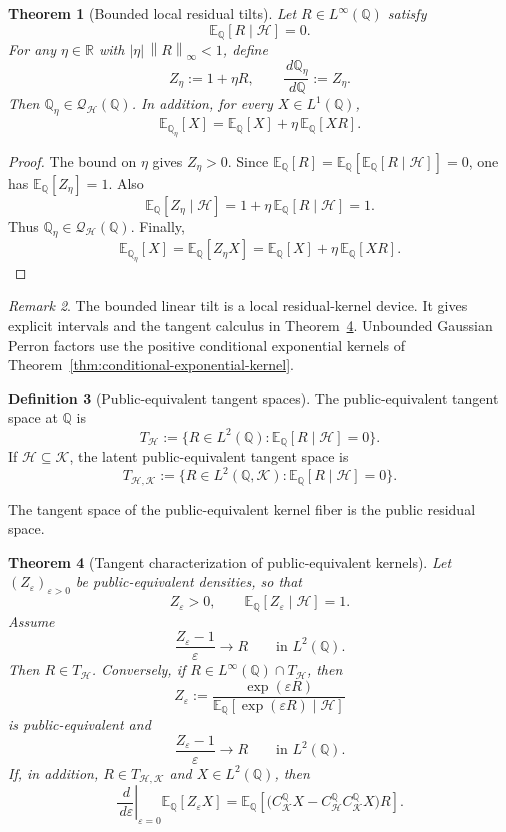 \documentclass[11pt,a4paper]{amsart}
\theoremstyle{plain}
\newtheorem{theorem}{Theorem}[section]
\theoremstyle{definition}
\newtheorem{definition}[theorem]{Definition}
\theoremstyle{remark}
\newtheorem{remark}[theorem]{Remark}
\newcommand{\R}{\mathbb{R}}
\newcommand{\QQ}{\mathbb{Q}}
\newcommand{\EE}{\mathbb{E}}
\newcommand{\cH}{\mathcal{H}}
\newcommand{\cK}{\mathcal{K}}
\newcommand{\cQ}{\mathcal{Q}}
\newcommand{\dd}{\,d}
\newcommand{\eps}{\varepsilon}
\newcommand{\norm}[1]{\left\lVert #1\right\rVert}
\begin{document}
\begin{theorem}[Bounded local residual tilts]\label{thm:kernel-tilt}
Let \(R\in L^\infty(\QQ)\) satisfy
\[
        \EE_\QQ[R\mid\cH]=0.
\]
For any \(\eta\in\R\) with \(|\eta|\,\norm{R}_\infty<1\), define
\[
        Z_\eta:=1+\eta R,
        \qquad
        \frac{\dd\QQ_\eta}{\dd\QQ}:=Z_\eta.
\]
Then \(\QQ_\eta\in\cQ_{\cH}(\QQ)\).  In addition, for every \(X\in L^1(\QQ)\),
\[
        \EE_{\QQ_\eta}[X]
        =
        \EE_\QQ[X]+\eta\,\EE_\QQ[XR].
\]
\end{theorem}

\begin{proof}
The bound on \(\eta\) gives \(Z_\eta>0\).  Since
\(\EE_\QQ[R]=\EE_\QQ[\EE_\QQ[R\mid\cH]]=0\), one has \(\EE_\QQ[Z_\eta]=1\).  Also
\[
        \EE_\QQ[Z_\eta\mid\cH]
        =
        1+\eta\,\EE_\QQ[R\mid\cH]
        =
        1.
\]
Thus \(\QQ_\eta\in\cQ_{\cH}(\QQ)\).  Finally,
\[
        \EE_{\QQ_\eta}[X]=\EE_\QQ[Z_\eta X]
        =
        \EE_\QQ[X]+\eta\,\EE_\QQ[XR].
\]
\end{proof}

\begin{remark}
The bounded linear tilt is a local residual-kernel device.  It gives explicit intervals and the
tangent calculus in Theorem~\ref{thm:tangent-kernels}.  Unbounded Gaussian Perron factors use the
positive conditional exponential kernels of Theorem~\ref{thm:conditional-exponential-kernel}.
\end{remark}

\begin{definition}[Public-equivalent tangent spaces]\label{def:public-equivalent-tangent}
The public-equivalent tangent space at \(\QQ\) is
\[
        T_{\cH}
        :=
        \{R\in L^2(\QQ):\EE_\QQ[R\mid\cH]=0\}.
\]
If \(\cH\subseteq\cK\), the latent public-equivalent tangent space is
\[
        T_{\cH,\cK}
        :=
        \{R\in L^2(\QQ,\cK):\EE_\QQ[R\mid\cH]=0\}.
\]
\end{definition}

The tangent space of the public-equivalent kernel fiber is the public residual space.

\begin{theorem}[Tangent characterization of public-equivalent kernels]\label{thm:tangent-kernels}
Let \((Z_\eps)_{\eps>0}\) be public-equivalent densities, so that
\[
        Z_\eps>0,\qquad \EE_\QQ[Z_\eps\mid\cH]=1.
\]
Assume
\[
        \frac{Z_\eps-1}{\eps}\longrightarrow R
        \qquad\text{in }L^2(\QQ).
\]
Then \(R\in T_{\cH}\).  Conversely, if \(R\in L^\infty(\QQ)\cap T_{\cH}\), then
\[
        Z_\eps
        :=
        \frac{\exp(\eps R)}
        {\EE_\QQ[\exp(\eps R)\mid\cH]}
\]
is public-equivalent and
\[
        \frac{Z_\eps-1}{\eps}\longrightarrow R
        \qquad\text{in }L^2(\QQ).
\]
If, in addition, \(R\in T_{\cH,\cK}\) and \(X\in L^2(\QQ)\), then
\[
        \left.\frac{\dd}{\dd\eps}\right|_{\eps=0}
        \EE_\QQ[Z_\eps X]
        =
        \EE_\QQ\!\left[
        \bigl(C_{\cK}^{\QQ}X-C_{\cH}^{\QQ}C_{\cK}^{\QQ}X\bigr)R
        \right].
\]
\end{theorem}
\end{document}
